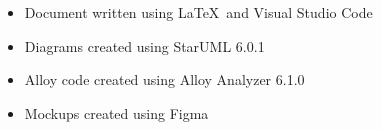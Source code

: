 \clearpage
{}
\label{sect:effort}



\clearpage
{}


\begin{itemize}
        \item Document written using \LaTeX  \ and Visual Studio Code
        \item Diagrams created using StarUML 6.0.1
        \item Alloy code created using Alloy Analyzer 6.1.0
        \item Mockups created using Figma
\end{itemize}





